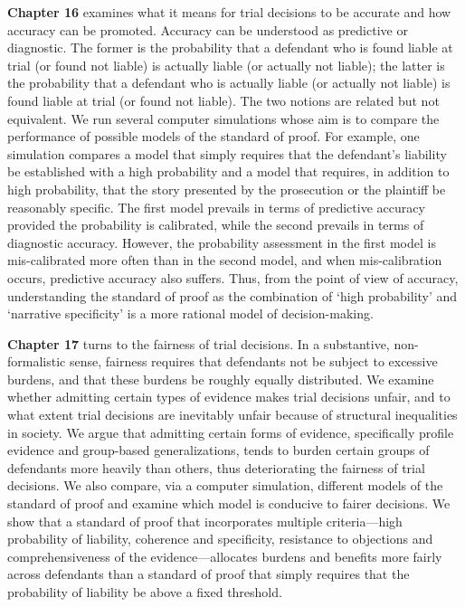 \documentclass[
  10pt,
  dvipsnames,enabledeprecatedfontcommands]{scrartcl}
\begin{document}
\textbf{Chapter 16} examines what it means for trial decisions to be
accurate and how accuracy can be promoted. Accuracy can be understood as
predictive or diagnostic. The former is the probability that a defendant
who is found liable at trial (or found not liable) is actually liable
(or actually not liable); the latter is the probability that a defendant
who is actually liable (or actually not liable) is found liable at trial
(or found not liable). The two notions are related but not equivalent.
We run several computer simulations whose aim is to compare the
performance of possible models of the standard of proof. For example,
one simulation compares a model that simply requires that the
defendant's liability be established with a high probability and a model
that requires, in addition to high probability, that the story presented
by the prosecution or the plaintiff be reasonably specific. The first
model prevails in terms of predictive accuracy provided the probability
is calibrated, while the second prevails in terms of diagnostic
accuracy. However, the probability assessment in the first model is
mis-calibrated more often than in the second model, and when
mis-calibration occurs, predictive accuracy also suffers. Thus, from the
point of view of accuracy, understanding the standard of proof as the
combination of `high probability' and `narrative specificity' is a more
rational model of decision-making.

\textbf{Chapter 17} turns to the fairness of trial decisions. In a
substantive, non-formalistic sense, fairness requires that defendants
not be subject to excessive burdens, and that these burdens be roughly
equally distributed. We examine whether admitting certain types of
evidence makes trial decisions unfair, and to what extent trial
decisions are inevitably unfair because of structural inequalities in
society. We argue that admitting certain forms of evidence, specifically
profile evidence and group-based generalizations, tends to burden
certain groups of defendants more heavily than others, thus
deteriorating the fairness of trial decisions. We also compare, via a
computer simulation, different models of the standard of proof and
examine which model is conducive to fairer decisions. We show that a
standard of proof that incorporates multiple criteria---high probability
of liability, coherence and specificity, resistance to objections and
comprehensiveness of the evidence---allocates burdens and benefits more
fairly across defendants than a standard of proof that simply requires
that the probability of liability be above a fixed threshold.
\end{document}
